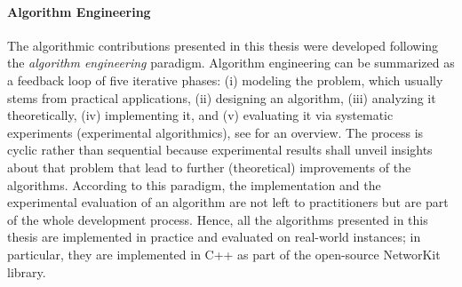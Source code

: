 \paragraph{Algorithm Engineering}
The algorithmic contributions presented in this thesis were developed following
the \emph{algorithm engineering} paradigm.
Algorithm engineering can be summarized as a feedback loop of five
iterative phases: (i) modeling the problem, which usually stems from
practical applications, (ii) designing an algorithm, (iii)
analyzing it theoretically, (iv) implementing it, and (v) evaluating it
via systematic experiments (\ie experimental algorithmics), see
 for an overview.
The process is cyclic rather than sequential because experimental results
shall unveil insights about that problem that lead to further (theoretical)
improvements of the algorithms.
According to this paradigm, the implementation and the experimental evaluation
of an algorithm are not left to practitioners but are part of the whole
development process. Hence, all the algorithms presented in this thesis
are implemented in practice and evaluated on real-world instances;
in particular, they are implemented in C++ as part of the open-source
NetworKit~\cite{DBLP:journals/netsci/StaudtSM16} library.

